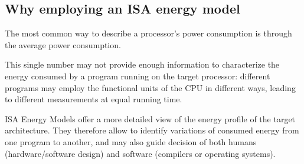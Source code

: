 \subsection{Why employing an ISA energy model}
The most common way to describe a processor's power consumption is through the average power consumption. \par
This single number may not provide enough information to characterize the energy consumed by a program running on the target processor: different programs may employ the functional units of the CPU in different ways, leading to different measurements at equal running time. \par
ISA Energy Models offer a more detailed view of the energy profile of the target architecture. They therefore allow to identify variations of consumed energy from one program to another, and may also guide decision of both humans (hardware/software design) and software (compilers or operating systems).

